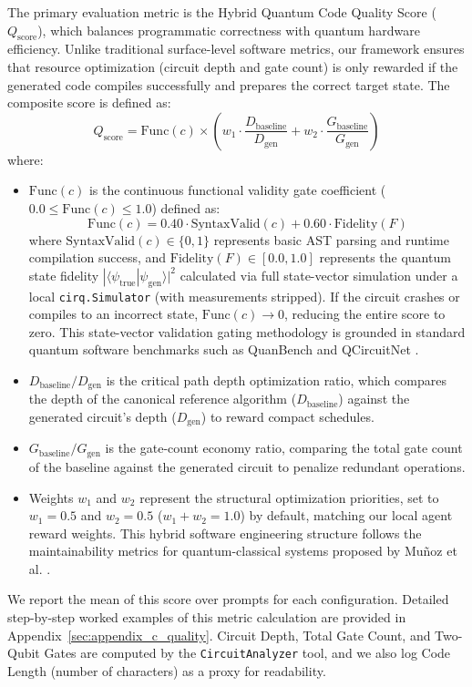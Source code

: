 \documentclass[runningheads]{llncs}
\begin{document}
The primary evaluation metric is the Hybrid Quantum Code Quality Score ($Q_{\text{score}}$), which balances programmatic correctness with quantum hardware efficiency. Unlike traditional surface-level software metrics, our framework ensures that resource optimization (circuit depth and gate count) is only rewarded if the generated code compiles successfully and prepares the correct target state. The composite score is defined as:
\begin{equation}
\label{eq:q_score}
Q_{\text{score}} = \text{Func}(c) \times \left( w_1 \cdot \frac{D_{\text{baseline}}}{D_{\text{gen}}} + w_2 \cdot \frac{G_{\text{baseline}}}{G_{\text{gen}}} \right)
\end{equation}
where:
\begin{itemize}
    \item $\text{Func}(c)$ is the continuous functional validity gate coefficient ($0.0 \le \text{Func}(c) \le 1.0$) defined as:
    \begin{equation}
    \text{Func}(c) = 0.40 \cdot \text{SyntaxValid}(c) + 0.60 \cdot \text{Fidelity}(F)
    \end{equation}
    where $\text{SyntaxValid}(c) \in \{0, 1\}$ represents basic AST parsing and runtime compilation success, and $\text{Fidelity}(F) \in [0.0, 1.0]$ represents the quantum state fidelity $|\langle \psi_{\text{true}} | \psi_{\text{gen}} \rangle|^2$ calculated via full state-vector simulation under a local \texttt{cirq.Simulator} (with measurements stripped). If the circuit crashes or compiles to an incorrect state, $\text{Func}(c) \to 0$, reducing the entire score to zero. This state-vector validation gating methodology is grounded in standard quantum software benchmarks such as QuanBench \cite{guo2025quanbench} and QCircuitNet \cite{yang2024qcircuitnet}.
    \item $D_{\text{baseline}} / D_{\text{gen}}$ is the critical path depth optimization ratio, which compares the depth of the canonical reference algorithm ($D_{\text{baseline}}$) against the generated circuit's depth ($D_{\text{gen}}$) to reward compact schedules.
    \item $G_{\text{baseline}} / G_{\text{gen}}$ is the gate-count economy ratio, comparing the total gate count of the baseline against the generated circuit to penalize redundant operations.
    \item Weights $w_1$ and $w_2$ represent the structural optimization priorities, set to $w_1 = 0.5$ and $w_2 = 0.5$ ($w_1 + w_2 = 1.0$) by default, matching our local agent reward weights. This hybrid software engineering structure follows the maintainability metrics for quantum-classical systems proposed by Mu{\~n}oz et al. \cite{munoz2024towards}.
\end{itemize}
We report the mean of this score over prompts for each configuration. Detailed step-by-step worked examples of this metric calculation are provided in Appendix~\ref{sec:appendix_c_quality}. Circuit Depth, Total Gate Count, and Two-Qubit Gates are computed by the \texttt{CircuitAnalyzer} tool, and we also log Code Length (number of characters) as a proxy for readability.
\end{document}
